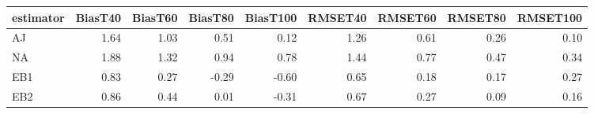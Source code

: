 \begin{table}[ht]
\centering
\begin{tabular}{lrrrrrrrr}
  \toprule
estimator & BiasT40 & BiasT60 & BiasT80 & BiasT100 & RMSET40 & RMSET60 & RMSET80 & RMSET100 \\ 
  \midrule
AJ & 1.64 & 1.03 & 0.51 & 0.12 & 1.26 & 0.61 & 0.26 & 0.10 \\ 
  NA & 1.88 & 1.32 & 0.94 & 0.78 & 1.44 & 0.77 & 0.47 & 0.34 \\ 
  EB1 & 0.83 & 0.27 & -0.29 & -0.60 & 0.65 & 0.18 & 0.17 & 0.27 \\ 
  EB2 & 0.86 & 0.44 & 0.01 & -0.31 & 0.67 & 0.27 & 0.09 & 0.16 \\ 
   \bottomrule
\end{tabular}
\end{table}
